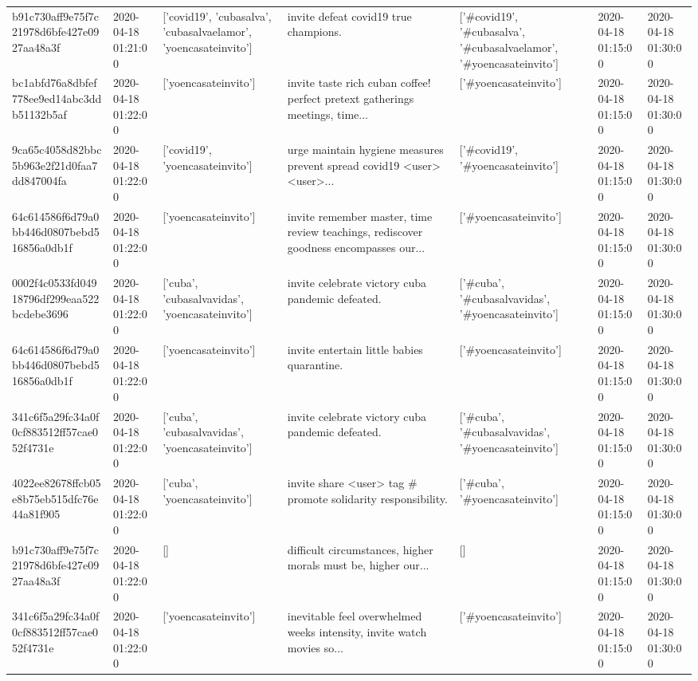\begin{tabular}{lllllll}
b91c730aff9e75f7c21978d6bfe427e0927aa48a3f & 2020-04-18 01:21:00 & ['covid19', 'cubasalva', 'cubasalvaelamor', 'yoencasateinvito'] & invite defeat covid19 true champions. & ['#covid19', '#cubasalva', '#cubasalvaelamor', '#yoencasateinvito'] & 2020-04-18 01:15:00 & 2020-04-18 01:30:00 \\
bc1abfd76a8dbfef778ee9ed14abc3ddb51132b5af & 2020-04-18 01:22:00 & ['yoencasateinvito'] & invite taste rich cuban coffee! perfect pretext gatherings meetings, time... & ['#yoencasateinvito'] & 2020-04-18 01:15:00 & 2020-04-18 01:30:00 \\
9ca65c4058d82bbc5b963e2f21d0faa7dd847004fa & 2020-04-18 01:22:00 & ['covid19', 'yoencasateinvito'] & urge maintain hygiene measures prevent spread covid19 <user> <user>... & ['#covid19', '#yoencasateinvito'] & 2020-04-18 01:15:00 & 2020-04-18 01:30:00 \\
64c614586f6d79a0bb446d0807bebd516856a0db1f & 2020-04-18 01:22:00 & ['yoencasateinvito'] & invite remember master, time review teachings, rediscover goodness encompasses our... & ['#yoencasateinvito'] & 2020-04-18 01:15:00 & 2020-04-18 01:30:00 \\
0002f4c0533fd04918796df299eaa522bcdebe3696 & 2020-04-18 01:22:00 & ['cuba', 'cubasalvavidas', 'yoencasateinvito'] & invite celebrate victory cuba pandemic defeated. & ['#cuba', '#cubasalvavidas', '#yoencasateinvito'] & 2020-04-18 01:15:00 & 2020-04-18 01:30:00 \\
64c614586f6d79a0bb446d0807bebd516856a0db1f & 2020-04-18 01:22:00 & ['yoencasateinvito'] & invite entertain little babies quarantine. & ['#yoencasateinvito'] & 2020-04-18 01:15:00 & 2020-04-18 01:30:00 \\
341c6f5a29fc34a0f0cf883512ff57cae052f4731e & 2020-04-18 01:22:00 & ['cuba', 'cubasalvavidas', 'yoencasateinvito'] & invite celebrate victory cuba pandemic defeated. & ['#cuba', '#cubasalvavidas', '#yoencasateinvito'] & 2020-04-18 01:15:00 & 2020-04-18 01:30:00 \\
4022ee82678ffcb05e8b75eb515dfc76e44a81f905 & 2020-04-18 01:22:00 & ['cuba', 'yoencasateinvito'] & invite share <user> tag \# promote solidarity responsibility. & ['#cuba', '#yoencasateinvito'] & 2020-04-18 01:15:00 & 2020-04-18 01:30:00 \\
b91c730aff9e75f7c21978d6bfe427e0927aa48a3f & 2020-04-18 01:22:00 & [] & difficult circumstances, higher morals must be, higher our... & [] & 2020-04-18 01:15:00 & 2020-04-18 01:30:00 \\
341c6f5a29fc34a0f0cf883512ff57cae052f4731e & 2020-04-18 01:22:00 & ['yoencasateinvito'] & inevitable feel overwhelmed weeks intensity, invite watch movies so... & ['#yoencasateinvito'] & 2020-04-18 01:15:00 & 2020-04-18 01:30:00 \\

\end{tabular}
